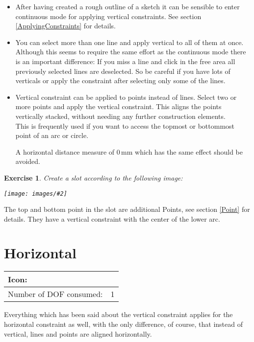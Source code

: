 \documentclass[12pt,titlepage]{article}
\newcommand{\icon}[1]{\raisebox{-1em}{\rule{0pt}{27pt}\texttt{[image: images/\#1]}}}
\newcommand{\img}[2]{\vspace{2ex}\noindent\texttt{[image: images/\#2]}}
\newcommand{\dofConsumed}{Number of DOF consumed:}
\newtheorem{Exercise}{Exercise}
\begin{document}
\begin{itemize}
\item After having created a rough outline of a sketch it can be sensible to enter
      continuous mode for applying vertical constraints. See section
      \vref{ApplyingConstraints} for details.
\item You can select more than one line and apply vertical to all of them at once.
      Although this seems to require the same effort as the continuous mode there is
      an important difference: If you miss a line and click in the free area all
      previously selected lines are deselected. So be careful if you have lots of
      verticals or apply the constraint after selecting only some of the lines.
\item Vertical constraint can be applied to points instead of lines. Select two or
      more points and apply the vertical constraint. This aligns the points
      vertically stacked, without needing any further construction elements.\\      
      This is frequently used if you want to access the topmost or bottommost point
      of an arc or circle.
      
      A horizontal distance measure of 0\,mm which has the same effect should be avoided.
\end{itemize}

\begin{Exercise}
Create a slot according to the following image:

\img{scale=0.7}{VerticalPoints}
\end{Exercise}
The top and bottom point in the slot are additional Points, see section \vref{Point}
for details. They have a vertical constraint with the center of the lower arc.


\section{Horizontal}
\label{Horizontal}
\begin{tabular}{|l|l|}
\hline
Icon: & \icon{Constraint_Horizontal}\\
\hline
\dofConsumed & 1 \\
\hline
\end{tabular}

Everything which has been said about the vertical constraint applies for the
horizontal constraint as well, with the only difference, of course, that instead of
vertical, lines and points are aligned horizontally.
\end{document}

